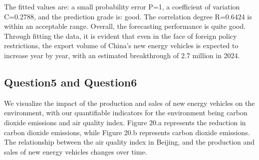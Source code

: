 \documentclass{apmcmthesis}
\begin{document}
The fitted values are: a small probability error P=1, a coefficient of variation C=0.2788, and the prediction grade is: good. The correlation degree R=0.6424 is within an acceptable range. Overall, the forecasting performance is quite good. Through fitting the data, it is evident that even in the face of foreign policy restrictions, the export volume of China's new energy vehicles is expected to increase year by year, with an estimated breakthrough of 2.7 million in 2024.

\subsection{Question5 and Question6}
We visualize the impact of the production and sales of new energy vehicles on the environment, with our quantifiable indicators for the environment being carbon dioxide emissions and air quality index.
Figure 20.a represents the reduction in carbon dioxide emissions, while Figure 20.b represents carbon dioxide emissions. The relationship between the air quality index in Beijing, and the production and sales of new energy vehicles changes over time.

\begin{figure}[htbp]
    \centering
    \quad
    \caption{}
    \end{figure}
\end{document}
